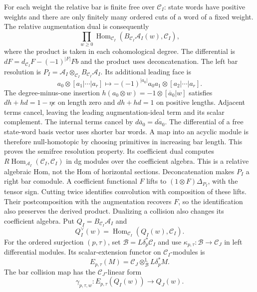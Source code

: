 For each weight the relative bar is finite free over
$\mathcal C_I$: state words have positive weights and there are
only finitely many ordered cuts of a word of a fixed weight.
The relative augmentation dual is consequently
\[
 \prod_{w\ge0}
 \operatorname{Hom}_{\mathcal C_I}
       (B_{\mathcal C_I}\mathcal A_I(w),\mathcal C_I),
\]
where the product is taken in each cohomological degree.
The differential is $dF=d_{\mathcal C_I}F-(-1)^{|F|}Fb$ and the
product uses deconcatenation. The left bar resolution is
$P_I=\mathcal A_I\otimes_{\mathcal C_I}B_{\mathcal C_I}\mathcal A_I$.
Its additional leading face is
\[
 a_0\otimes[a_1|\cdots|a_r]\longmapsto
 -(-1)^{|a_0|}a_0a_1\otimes[a_2|\cdots|a_r].
\]
The degree-minus-one insertion
$h(a_0\otimes w)=-1\otimes[\overline a_0|w]$ satisfies
$dh+hd=1-\eta\epsilon$ on length zero and $dh+hd=1$ on
positive lengths. Adjacent terms cancel, leaving the leading
augmentation-ideal term and its scalar complement. The internal
terms cancel by $d\overline a_0=\overline{da_0}$.
The differential of a free state-word basis vector uses shorter
bar words. A map into an acyclic module is therefore null-homotopic
by choosing primitives in increasing bar length. This proves the
semifree resolution property. Its coefficient dual computes
$R\operatorname{Hom}_{\mathcal A_I}(\mathcal C_I,\mathcal C_I)$
in dg modules over the coefficient algebra. This is a relative
algebraic Hom, not the Hom of horizontal sections.
Deconcatenation makes $P_I$ a right bar comodule. A coefficient
functional $F$ lifts to $(1\otimes F)\Delta_{P_I}$, with the
tensor sign. Cutting twice identifies convolution with composition
of these lifts. Their postcomposition with the augmentation recovers
$F$, so the identification also preserves the derived product.
Dualizing a collision also changes its coefficient algebra.
Put $Q_I=B_{\mathcal C_I}\mathcal A_I$ and
\[
 Q_I^\vee(w)=\operatorname{Hom}_{\mathcal C_I}
                   (Q_I(w),\mathcal C_I).
\]
For the ordered surjection $(p,\tau)$, set
$\mathcal B=L\delta_p^*\mathcal C_I$ and use
$\kappa_{p,\tau}:\mathcal B\to\mathcal C_J$ in left differential
modules. Its scalar-extension functor on $\mathcal C_I$-modules is
\[
 E_{p,\tau}(M)=\mathcal C_J\otimes_{\mathcal B}^{\mathbb L}
                                L\delta_p^*M.
\]
The bar collision map has the $\mathcal C_J$-linear form
\[
 \gamma_{p,\tau,w}:E_{p,\tau}(Q_I(w))\longrightarrow Q_J(w).
\]

